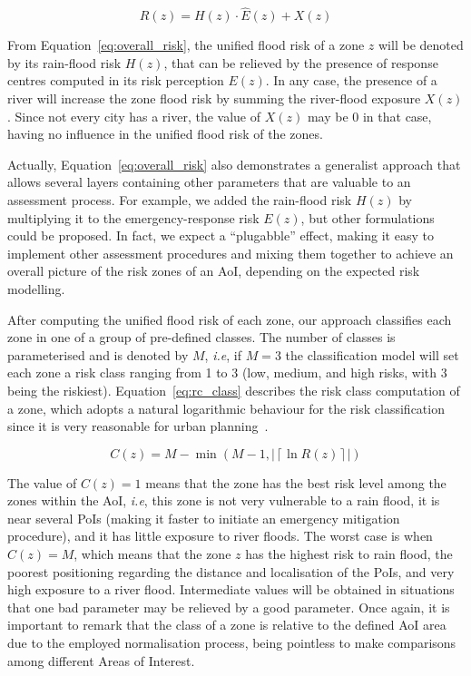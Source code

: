 \begin{refsection}
\begin{equation}
  \label{eq:overall_risk}
  R(z) = H(z) \cdot \widehat{E}(z) + X(z)
\end{equation}

From Equation~\ref{eq:overall_risk}, the unified flood risk of a zone $z$ will be denoted by its rain-flood risk $H(z)$, that can be relieved by the presence of response centres computed in its risk perception $E(z)$. In any case, the presence of a river will increase the zone flood risk by summing the river-flood exposure $X(z)$. Since not every city has a river, the value of $X(z)$ may be 0 in that case, having no influence in the unified flood risk of the zones.

Actually, Equation~\ref{eq:overall_risk} also demonstrates a generalist approach that allows several layers containing other parameters that are valuable to an assessment process. For example, we added the rain-flood risk $H(z)$ by multiplying it to the emergency-response risk $E(z)$, but other formulations could be proposed. In fact, we expect a ``plugabble'' effect, making it easy to implement other assessment procedures and mixing them together to achieve an overall picture of the risk zones of an AoI, depending on the expected risk modelling.

After computing the unified flood risk of each zone, our approach classifies each zone in one of a group of pre-defined classes. The number of classes is parameterised and is denoted by $M$, \textit{i.e}, if $M = 3$ the classification model will set each zone a risk class ranging from 1 to 3 (low, medium, and high risks, with 3 being the riskiest). Equation~\ref{eq:rc_class} describes the risk class computation of a zone, which adopts a natural logarithmic behaviour for the risk classification since it is very reasonable for urban planning~\cite{log2,log3}.

\begin{equation}
  \label{eq:rc_class}
  C(z) = M - \min\left(M - 1, \left| \left\lceil \ln{R(z)} \right\rceil \right| \right)
\end{equation}

The value of $C(z) = 1$ means that the zone has the best risk level among the zones within the AoI, \textit{i.e}, this zone is not very vulnerable to a rain flood, it is near several PoIs (making it faster to initiate an emergency mitigation procedure), and it has little exposure to river floods. The worst case is when $C(z) = M$, which means that the zone $z$ has the highest risk to rain flood, the poorest positioning regarding the distance and localisation of the PoIs, and very high exposure to a river flood. Intermediate values will be obtained in situations that one bad parameter may be relieved by a good parameter. Once again, it is important to remark that the class of a zone is relative to the defined AoI area due to the employed normalisation process, being pointless to make comparisons among different Areas of Interest.


\end{refsection}
